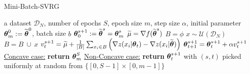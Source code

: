 \begin{algorithm}[tb]
	\caption{Mini-Batch-SVRG}
	\label{alg:batch-svrg}
	\begin{algorithmic}
		 a dataset $\mathcal{D}_N$, number of epochs $S$, epoch size $m$, step size $\alpha$, initial parameter $\boldsymbol{\theta}_{m}^0:=\widetilde{\boldsymbol{\theta}}^0$, batch size $b$
		\STATE $\boldsymbol{\theta}_0^{s+1} := \widetilde{\boldsymbol{\theta}}^{s} = \boldsymbol{\theta}_{m}^s$
		\STATE $\widetilde{\mu} = \nabla f(\widetilde{\boldsymbol{\theta}}^s)$
		\STATE $B=\phi$
		\STATE $x \sim \mathcal{U}\left(\mathcal{D}_N\right)$
		\STATE $B=B ~\cup~ x$
		\ENDFOR
		\STATE $v^{s+1}_t = 
		\widetilde{\mu} + 
		\frac{1}{\left|B\right|}\sum_{x_i\in B} \left(\nabla z(x_i | \boldsymbol{\theta}_t) - \nabla z(x_i | \widetilde{\boldsymbol{\theta}})\right)
		$
		\STATE $\boldsymbol{\theta}_{t+1}^{s+1} = \boldsymbol{\theta}_t^{s+1} + \alpha v^{s+1}_t$
		\ENDFOR
		\ENDFOR
		\STATE \underline{Concave case:} \textbf{return} $\boldsymbol{\theta}_{m}^S$
		\STATE \underline{Non-Concave case:} \textbf{return} $\boldsymbol{\theta}_t^{s+1}$ with $(s,t)$ picked uniformly at random from $\{[0,S-1]\times[0,m-1]\}$
	\end{algorithmic}
\end{algorithm}
\vspace{-0.05in}